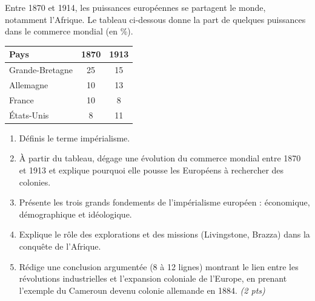 \documentclass[11pt]{article}
\begin{document}
\begin{exercice}
Entre 1870 et 1914, les puissances européennes se partagent le monde, notamment l'Afrique. Le tableau ci-dessous donne la part de quelques puissances dans le commerce mondial (en \%).

\begin{center}
\begin{tabular}{|l|c|c|}
\hline
\textbf{Pays} & 1870 & 1913 \\
\hline
Grande-Bretagne & 25 & 15 \\
\hline
Allemagne & 10 & 13 \\
\hline
France & 10 & 8 \\
\hline
États-Unis & 8 & 11 \\
\hline
\end{tabular}
\end{center}

\begin{enumerate}
\item Définis le terme impérialisme.
\item À partir du tableau, dégage une évolution du commerce mondial entre 1870 et 1913 et explique pourquoi elle pousse les Européens à rechercher des colonies.
\item Présente les trois grands fondements de l'impérialisme européen : économique, démographique et idéologique.
\item Explique le rôle des explorations et des missions (Livingstone, Brazza) dans la conquête de l'Afrique.
\item Rédige une conclusion argumentée (8 à 12 lignes) montrant le lien entre les révolutions industrielles et l'expansion coloniale de l'Europe, en prenant l'exemple du Cameroun devenu colonie allemande en 1884. \textit{(2 pts)}
\end{enumerate}
\end{exercice}
\end{document}
